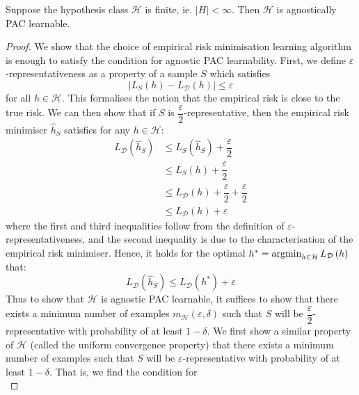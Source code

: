 \documentclass[11pt]{report} %
\begin{document}
\begin{theorem}
Suppose the hypothesis class $\mathcal{H}$ is finite, ie. $\left|H\right| < \infty$. Then $\mathcal{H}$ is agnostically PAC learnable.
\end{theorem}
\begin{proof}
We show that the choice of empirical risk minimisation learning algorithm is enough to satisfy the condition for agnostic PAC learnability. First, we define $\varepsilon$-representativeness as a property of a sample $S$ which satisfies
\begin{equation}
\left|L_{S}\left(h\right) - L_{\mathcal{D}}\left(h\right)\right| \leq \varepsilon
\end{equation}
for all $h \in \mathcal{H}$. This formalises the notion that the empirical risk is close to the true risk. We can then show that if $S$ is $\dfrac{\varepsilon}{2}$-representative, then the empirical risk minimiser $\widehat{h}_{S}$ satisfies for any $h \in \mathcal{H}$:
\begin{align}
L_{\mathcal{D}}\left(\widehat{h}_{S}\right) &\leq L_{S}\left(\widehat{h}_{S}\right) + \dfrac{\varepsilon}{2} \\
&\leq L_{S}\left(h\right) + \dfrac{\varepsilon}{2} \\
&\leq L_{\mathcal{D}}\left(h\right) + \dfrac{\varepsilon}{2} + \dfrac{\varepsilon}{2} \\
&\leq L_{\mathcal{D}}\left(h\right) + \varepsilon
\end{align}
where the first and third inequalities follow from the definition of $\varepsilon$-representativeness, and the second inequality is due to the characterisation of the empirical risk minimiser. Hence, it holds for the optimal $h^{*} = \operatorname*{argmin}_{h \in \mathcal{H}}L_{\mathcal{D}}\left(h\right)$ that:
\begin{equation}
L_{\mathcal{D}}\left(\widehat{h}_{S}\right) \leq L_{\mathcal{D}}\left(h^{*}\right) + \varepsilon
\end{equation}
Thus to show that $\mathcal{H}$ is agnostic PAC learnable, it suffices to show that there exists a minimum number of examples $m_{\mathcal{H}}\left(\varepsilon, \delta\right)$ such that $S$ will be $\dfrac{\varepsilon}{2}$-representative with probability of at least $1 - \delta$. We first show a similar property of $\mathcal{H}$ (called the uniform convergence property) that there exists a minimum number of examples such that $S$ will be $\varepsilon$-representative with probability of at least $1 - \delta$. That is, we find the condition for
\begin{equation}

\end{equation}
\end{proof}
\end{document}
